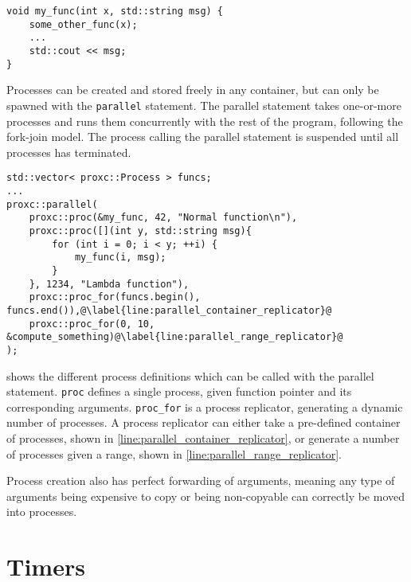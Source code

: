 \begin{lstfloat}
\begin{lstlisting}[caption={Example of process function.}, label={lst:code_example_process_func}, style={CustomC++}]
void my_func(int x, std::string msg) {
    some_other_func(x);
    ... 
    std::cout << msg;
}
\end{lstlisting}
\end{lstfloat}

Processes can be created and stored freely in any container, but can only be spawned with the \texttt{parallel} statement. The parallel statement takes one\hyp{}or\hyp{}more processes and runs them concurrently with the rest of the program, following the fork\hyp{}join model. The process calling the parallel statement is suspended until all processes has terminated.

\begin{lstfloat}
\begin{lstlisting}[caption={The parallel statement.}, label={lst:parallel_statement}, style={CustomC++}]
std::vector< proxc::Process > funcs;
...
proxc::parallel(
    proxc::proc(&my_func, 42, "Normal function\n"),
    proxc::proc([](int y, std::string msg){
        for (int i = 0; i < y; ++i) {
            my_func(i, msg);
        }
    }, 1234, "Lambda function"),
    proxc::proc_for(funcs.begin(), funcs.end()),@\label{line:parallel_container_replicator}@
    proxc::proc_for(0, 10, &compute_something)@\label{line:parallel_range_replicator}@
);
\end{lstlisting}
\end{lstfloat}

 shows the different process definitions which can be called with the parallel statement. \texttt{proc} defines a single process, given function pointer and its corresponding arguments. \texttt{proc\_for} is a process replicator, generating a dynamic number of processes. A process replicator can either take a pre\hyp{}defined container of processes, shown in \cref{line:parallel_container_replicator}, or generate a number of processes given a range, shown in \cref{line:parallel_range_replicator}.

Process creation also has perfect forwarding of arguments, meaning any type of arguments being expensive to copy or being non\hyp{}copyable can correctly be moved into processes.


\section{Timers}



